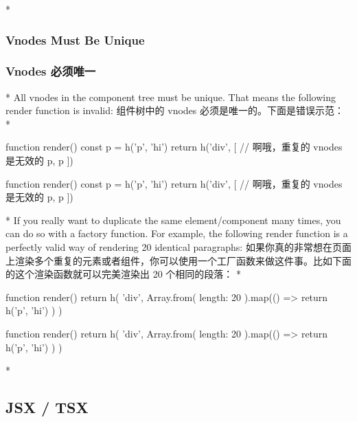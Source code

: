 \begin{paracol}{2} 
 
\switchcolumn[0]*%
\subsubsection{Vnodes Must Be Unique}
\switchcolumn
\subsubsection{Vnodes 必须唯一}
\switchcolumn[0]*%
All vnodes in the component tree must be unique. That means the
following render function is invalid:
\switchcolumn
组件树中的 vnodes 必须是唯一的。下面是错误示范：
\switchcolumn[0]*%
\begin{codeJs}
function render() {
  const p = h('p', 'hi')
  return h('div', [
    // 啊哦，重复的 vnodes 是无效的
    p,
    p
  ])
}
\end{codeJs}
\switchcolumn
\begin{codeJs}
function render() {
  const p = h('p', 'hi')
  return h('div', [
    // 啊哦，重复的 vnodes 是无效的
    p,
    p
  ])
}
\end{codeJs}
\switchcolumn[0]*%
If you really want to duplicate the same element/component many times,
you can do so with a factory function. For example, the following render
function is a perfectly valid way of rendering 20 identical paragraphs:
\switchcolumn
如果你真的非常想在页面上渲染多个重复的元素或者组件，你可以使用一个工厂函数来做这件事。比如下面的这个渲染函数就可以完美渲染出
20 个相同的段落：
\switchcolumn[0]*%
\begin{codeJs}
function render() {
  return h(
    'div',
    Array.from({ length: 20 }).map(() => {
      return h('p', 'hi')
    })
  )
}
\end{codeJs}
\switchcolumn
\begin{codeJs}
function render() {
  return h(
    'div',
    Array.from({ length: 20 }).map(() => {
      return h('p', 'hi')
    })
  )
}
\end{codeJs}
\switchcolumn[0]*%
\subsection{JSX / TSX}
\switchcolumn

\end{paracol}

